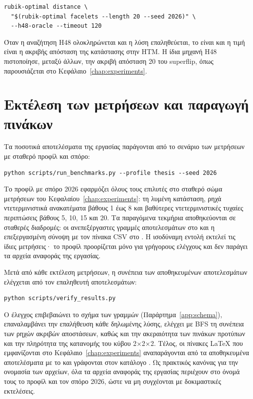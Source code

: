 \begin{verbatim}
rubik-optimal distance \
  "$(rubik-optimal facelets --length 20 --seed 2026)" \
  --h48-oracle --timeout 120
\end{verbatim}

Όταν η αναζήτηση H48 ολοκληρώνεται και η λύση επαληθεύεται, το  είναι  και η τιμή είναι η ακριβής απόσταση της κατάστασης στην HTM. Η ίδια μηχανή H48 πιστοποίησε, μεταξύ άλλων, την ακριβή απόσταση 20 του superflip, όπως παρουσιάζεται στο Κεφάλαιο~\ref{chap:experiments}.

\section{Εκτέλεση των μετρήσεων και παραγωγή πινάκων}
\label{sec:usage-benchmarks}

Τα ποσοτικά αποτελέσματα της εργασίας παράγονται από το σενάριο των μετρήσεων με σταθερό προφίλ και σπόρο:

\begin{verbatim}
python scripts/run_benchmarks.py --profile thesis --seed 2026
\end{verbatim}

Το προφίλ  με σπόρο 2026 εφαρμόζει όλους τους επιλυτές στο σταθερό σώμα μετρήσεων του Κεφαλαίου~\ref{chap:experiments}: τη λυμένη κατάσταση, ρηχά ντετερμινιστικά ανακατέματα βάθους 1 έως 8 και βαθύτερες ντετερμινιστικές τυχαίες περιπτώσεις βάθους 5, 10, 15 και 20. Τα παραγόμενα τεκμήρια αποθηκεύονται σε σταθερές διαδρομές: οι ανεπεξέργαστες γραμμές αποτελεσμάτων στο  και η επεξεργασμένη σύνοψη με τον πίνακα CSV στο . Η ισοδύναμη εντολή  εκτελεί τις ίδιες μετρήσεις· το προφίλ  προορίζεται μόνο για γρήγορους ελέγχους και δεν παράγει τα αρχεία αναφοράς της εργασίας.

Μετά από κάθε εκτέλεση μετρήσεων, η συνέπεια των αποθηκευμένων αποτελεσμάτων ελέγχεται από τον επαληθευτή αποτελεσμάτων:

\begin{verbatim}
python scripts/verify_results.py
\end{verbatim}

Ο έλεγχος επιβεβαιώνει το σχήμα των γραμμών (Παράρτημα~\ref{app:schema}), επαναλαμβάνει την επαλήθευση κάθε δηλωμένης λύσης, ελέγχει με BFS τη συνέπεια των ρηχών ακριβών αποστάσεων, καθώς και την ακεραιότητα των πινάκων προτύπων και την πληρότητα της κατανομής του κύβου 2×2×2. Τέλος, οι πίνακες LaTeX που εμφανίζονται στο Κεφάλαιο~\ref{chap:experiments} αναπαράγονται από τα αποθηκευμένα αποτελέσματα με το  και γράφονται στον κατάλογο . Ως πρακτικός κανόνας για την ονομασία των αρχείων, όλα τα αρχεία αναφοράς της εργασίας περιέχουν στο όνομά τους το προφίλ  και τον σπόρο 2026, ώστε να μη συγχέονται με δοκιμαστικές εκτελέσεις.

